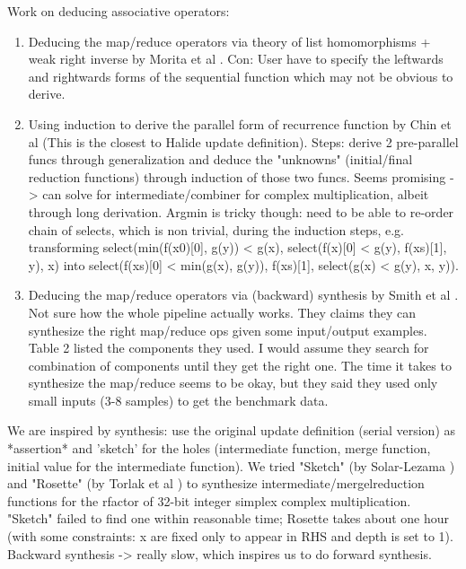Work on deducing associative operators: \\
\begin{enumerate}
	\item Deducing the map/reduce operators via theory of list homomorphisms + weak right inverse by Morita et al \cite{Morita:2007:AIG:1250734.1250752}. Con: User have to specify the leftwards and rightwards forms of the sequential function which may not be obvious to derive.
	\item Using induction to derive the parallel form of recurrence function by Chin et al \cite{Teo:1997:DEP:266670.266697} (This is the closest to Halide update definition). Steps: derive 2 pre-parallel funcs through generalization and deduce the "unknowns" (initial/final reduction functions) through induction of those two funcs. Seems promising -> can solve for intermediate/combiner for complex multiplication, albeit through long derivation. Argmin is tricky though: need to be able to re-order chain of selects, which is non trivial, during the induction steps, e.g. transforming select(min(f(x0)[0], g(y)) < g(x), select(f(x)[0] < g(y), f(xs)[1], y), x) into select(f(xs)[0] < min(g(x), g(y)), f(xs)[1], select(g(x) < g(y), x, y)).
	\item Deducing the map/reduce operators via (backward) synthesis by Smith et al \cite{Smith:2016:MPS:2908080.2908102}. Not sure how the whole pipeline actually works. They claims they can synthesize the right map/reduce ops given some input/output examples. Table 2 listed the components they used. I would assume they search for combination of components until they get the right one. The time it takes to synthesize the map/reduce seems to be okay, but they said they used only small inputs (3-8 samples) to get the benchmark data. \\
\end{enumerate}

We are inspired by synthesis: use the original update definition (serial version) as *assertion* and 'sketch' for the holes (intermediate function, merge function, initial value for the intermediate function). We tried "Sketch" (by Solar-Lezama \cite{Solar-Lezama:2008:PSS:1714168}) and "Rosette" (by Torlak et al \cite{Torlak:2013:GSL:2509578.2509586}) to synthesize intermediate/mergelreduction functions for the rfactor of 32-bit integer simplex complex multiplication. "Sketch" failed to find one within reasonable time; Rosette takes about one hour (with some constraints: x are fixed only to appear in RHS and depth is set to 1). Backward synthesis -> really slow, which inspires us to do forward synthesis.\\

